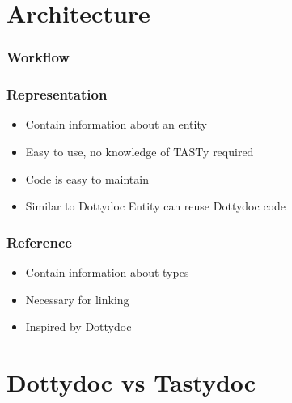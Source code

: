 \documentclass{beamer}
\begin{document}
\section{Architecture}

\begin{frame}
  \frametitle{Workflow}
  
  \begin{center}
  \end{center}
\end{frame}

\begin{frame}
  \frametitle{Representation}
  
  \begin{itemize}
    \item Contain information about an entity 
    \item Easy to use, no knowledge of TASTy required 
    \item Code is easy to maintain 
    \item Similar to Dottydoc Entity \textrightarrow can reuse Dottydoc code
  \end{itemize}
\end{frame}

\begin{frame}
  \frametitle{Reference}
  \begin{itemize}
    \item Contain information about types
    \item Necessary for linking
    \item Inspired by Dottydoc
  \end{itemize}
\end{frame}

\section{Dottydoc vs Tastydoc}
\end{document}
